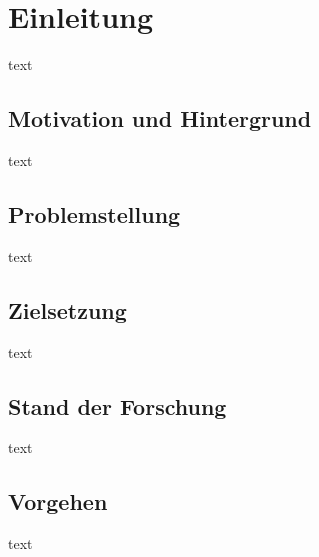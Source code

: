 \section{Einleitung}
text
\subsection{Motivation und Hintergrund}
text
\subsection{Problemstellung}
text
\subsection{Zielsetzung}
text
\subsection{Stand der Forschung}
text
\subsection{Vorgehen}
text